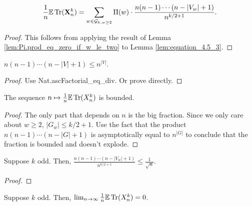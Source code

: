 \begin{lemma}[Simplifying the summation with the fact $\Pi (G,w) = 0$ in certain cases: R-1-16 : lem:equation\_4.8]
  \label{lem:equation_4.8}
  \[
  \frac{1}{n} \mathbb{E} \operatorname{Tr} (\mathbf{X}_n^k)
  = \sum_{w \in \mathcal{G}_{k, w \geq 2}} \Pi (w) \cdot \frac{n (n-1) \cdots (n - |V_w| + 1)}{n^{k/2+1}}.
  \]

\end{lemma}

\begin{proof}
  This follows from applying the result of Lemma \ref{lem:Pi.prod_eq_zero_if_w_le_two} to Lemma \ref{lem:equation_4.5_3}.
\end{proof}


\begin{lemma}
  \label{lem:asc_factorial_product}
  $n(n-1)\cdots (n-|V|+1) \le n^{|V|}$.
\end{lemma}

\begin{proof}
  Use Nat.ascFactorial\_eq\_div. Or prove directly.
\end{proof}


\begin{lemma}
  \label{lem:bounded_map}
  The sequence $n\mapsto \frac1n\mathbb{E}\operatorname{Tr}(X_n^k)$ is bounded.
\end{lemma}

\begin{proof}
  \notready
  The only part that depends on $n$ is the big fraction. Since we only care about $w \ge 2$, $|G_w| \le k/2 + 1$.
  Use the fact that the product $n(n-1)\cdots (n-|G|+1)$ is asymptotically equal to $n^{|G|}$ to
  conclude that the fraction is bounded and doesn't explode.
\end{proof}


\begin{lemma}
  \label{lem:odd_ratio_bound}
  \notready
  Suppose $k$ odd. Then, $\frac{n(n-1)\cdots(n-|V_w|+1)}{n^{k/2+1}} \le \frac{1}{\sqrt{n}}$.
\end{lemma}

\begin{proof}
  \notready
\end{proof}


\begin{proposition}
  \label{prop:odd_case}
  \notready
  Suppose $k$ odd. Then, $\lim_{n\to\infty} \frac{1}{n}\mathbb{E}\operatorname{Tr}(X_n^k) = 0$.
\end{proposition}

